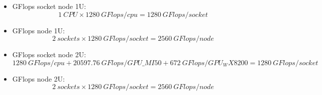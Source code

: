\begin{itemize}
    \item GFlops socket node 1U:\\
        \[ 1\ CPU \times 1280\ GFlops/cpu = 1280\ GFlops/socket\]
    \item GFlops node 1U:\\
\[2\ sockets \times 1280\ GFlops/socket = 2560\ GFlops/node\]
    \item GFlops socket node 2U:\\
\[\]
        \[ 1280\ GFlops/cpu + 20597.76\ GFlops/GPU\_MI50 + 672\ GFlops/GPU_WX8200 = 1280\ GFlops/socket\]

    \item GFlops node 2U:\\
\[2\ sockets \times 1280\ GFlops/socket = 2560\ GFlops/node\]
\end{itemize}
